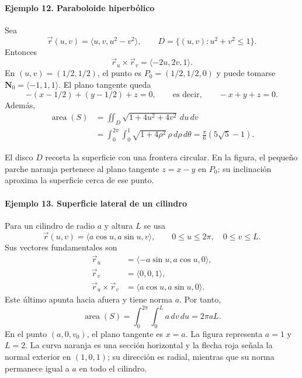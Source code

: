 \paragraph{Ejemplo 12. Paraboloide hiperbólico}
Sea
\[
\vec r(u,v)=\langle u,v,u^2-v^2\rangle,
\qquad D=\{(u,v):u^2+v^2\leq1\}.
\]
Entonces
\[
\vec r_u\times\vec r_v=\langle-2u,2v,1\rangle.
\]
En $(u,v)=(1/2,1/2)$, el punto es $P_0=(1/2,1/2,0)$ y puede tomarse $\mathbf{N}_0=\langle-1,1,1\rangle$. El plano tangente queda
\[
-(x-1/2)+(y-1/2)+z=0,
\qquad\text{es decir,}\qquad -x+y+z=0.
\]
Además,
\begin{align*}
\operatorname{area}(S)
&=\iint_D\sqrt{1+4u^2+4v^2}\,du\,dv\\
&=\int_0^{2\pi}\int_0^1\sqrt{1+4\rho^2}\,\rho\,d\rho\,d\theta
=\frac{\pi}{6}(5\sqrt5-1).
\end{align*}
\begingroup\shorthandoff{>}
\begin{center}
\end{center}
\endgroup
El disco $D$ recorta la superficie con una frontera circular. En la figura, el pequeño parche naranja pertenece al plano tangente $z=x-y$ en $P_0$; su inclinación aproxima la superficie cerca de ese punto.

\paragraph{Ejemplo 13. Superficie lateral de un cilindro}
Para un cilindro de radio $a$ y altura $L$ se usa
\[
\vec r(u,v)=\langle a\cos u,a\sin u,v\rangle,
\qquad0\leq u\leq2\pi,\quad0\leq v\leq L.
\]
Sus vectores fundamentales son
\begin{align*}
\vec r_u&=\langle-a\sin u,a\cos u,0\rangle,\\
\vec r_v&=\langle0,0,1\rangle,\\
\vec r_u\times\vec r_v&=\langle a\cos u,a\sin u,0\rangle.
\end{align*}
Este último apunta hacia afuera y tiene norma $a$. Por tanto,
\[
\operatorname{area}(S)=\int_0^{2\pi}\int_0^L a\,dv\,du=2\pi aL.
\]
En el punto $(a,0,v_0)$, el plano tangente es $x=a$.
La figura representa $a=1$ y $L=2$. La curva naranja es una sección horizontal y la flecha roja señala la normal exterior en $(1,0,1)$; su dirección es radial, mientras que su norma permanece igual a $a$ en todo el cilindro.

